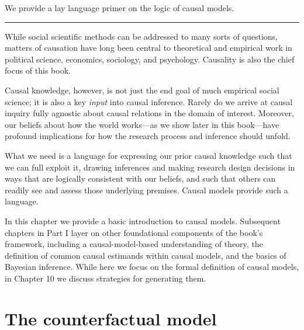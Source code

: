 \documentclass[12pt,]{book}
\begin{document}
We provide a lay language primer on the logic of causal models.

\begin{center}\rule{0.5\linewidth}{\linethickness}\end{center}

While social scientific methods can be addressed to many sorts of questions, matters of causation have long been central to theoretical and empirical work in political science, economics, sociology, and psychology. Causality is also the chief focus of this book.

Causal knowledge, however, is not just the end goal of much empirical social science; it is also a key \emph{input} into causal inference. Rarely do we arrive at causal inquiry fully agnostic about causal relations in the domain of interest. Moreover, our beliefs about how the world works---as we show later in this book---have profound implications for how the research process and inference should unfold.

What we need is a language for expressing our prior causal knowledge such that we can full exploit it, drawing inferences and making research design decisions in ways that are logically consistent with our beliefs, and such that others can readily see and assess those underlying premises. Causal models provide such a language.

In this chapter we provide a basic introduction to causal models. Subsequent chapters in Part I layer on other foundational components of the book's framework, including a causal-model-based understanding of theory, the definition of common causal estimands within causal models, and the basics of Bayesian inference. While here we focus on the formal definition of causal models, in Chapter 10 we discuss strategies for generating them.

\hypertarget{the-counterfactual-model}{%
\section{The counterfactual model}\label{the-counterfactual-model}}
\end{document}
